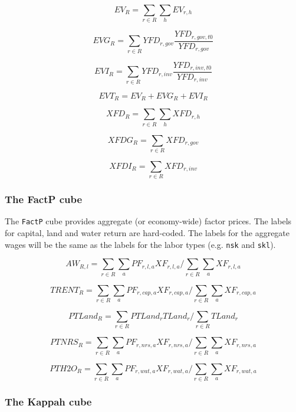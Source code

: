 \[
\mathit{EV}_R = \sum_{r \in R} \sum_{h} {\mathit{EV}_{r,h}}
\]

\[
\mathit{EVG}_R = \sum_{r \in R} {\mathit{YFD}_{r,\mathit{gov}}
	\frac{\mathit{YFD}_{r,\mathit{gov},t0}}{\mathit{YFD}_{r,\mathit{gov}}}}
\]

\[
\mathit{EVI}_R = \sum_{r \in R} {\mathit{YFD}_{r,\mathit{inv}}
	\frac{\mathit{YFD}_{r,\mathit{inv},t0}}{\mathit{YFD}_{r,\mathit{inv}}}}
\]

\[
\mathit{EVT}_R = \mathit{EV}_R + \mathit{EVG}_R + \mathit{EVI}_R
\]

\[
\mathit{XFD}_R = \sum_{r \in R} \sum_h {\mathit{XFD}_{r,\mathit{h}}}
\]

\[
\mathit{XFDG}_R = \sum_{r \in R} {\mathit{XFD}_{r,\mathit{gov}}}
\]

\[
\mathit{XFDI}_R = \sum_{r \in R} {\mathit{XFD}_{r,\mathit{inv}}}
\]

\subsubsection{The FactP cube}

The \texttt{FactP} cube provides aggregate (or economy-wide) factor prices. The labels
for capital, land and water return are hard-coded. The labels for the aggregate
wages will be the same as the labels for the labor types (e.g. \texttt{nsk} and \texttt{skl}).

\[
\mathit{AW}_{R,l} = \sum_{r \in R} {\sum_a{\mathit{PF}_{r,l,a}\mathit{XF}_{r,l,a}}} \bigg/ \sum_{r \in R} {\sum_a{\mathit{XF}_{r,l,a}}}
\]

\[
\mathit{TRENT}_{R} = \sum_{r \in R} {\sum_a{\mathit{PF}_{r,\mathit{cap},a}\mathit{XF}_{r,\mathit{cap},a}}} \bigg/ \sum_{r \in R} {\sum_a{\mathit{XF}_{r,\mathit{cap},a}}}
\]

\[
\mathit{PTLand}_{R} = \sum_{r \in R} {{\mathit{PTLand}_{r} \mathit{TLand}_{r}}} \bigg/ \sum_{r \in R} {\mathit{TLand}_{r}}
\]

\[
\mathit{PTNRS}_{R} = \sum_{r \in R} {\sum_a{\mathit{PF}_{r,\mathit{nrs},a}\mathit{XF}_{r,\mathit{nrs},a}}} \bigg/ \sum_{r \in R} {\sum_a{\mathit{XF}_{r,\mathit{nrs},a}}}
\]

\[
\mathit{PTH2O}_{R} = \sum_{r \in R} {\sum_a{\mathit{PF}_{r,\mathit{wat},a}\mathit{XF}_{r,\mathit{wat},a}}} \bigg/ \sum_{r \in R} {\sum_a{\mathit{XF}_{r,\mathit{wat},a}}}
\]

\subsubsection{The Kappah cube}

